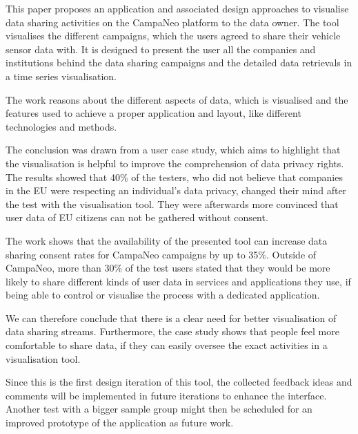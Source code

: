\documentclass[../paper.tex]{subfiles}
\begin{document}
  This paper proposes an application and associated design approaches
  to visualise data sharing activities on the CampaNeo platform to
  the data owner. The tool visualises the different campaigns, which
  the users agreed to share their vehicle sensor data with. It is
  designed to present the user all the companies and institutions
  behind the data sharing campaigns and the detailed data retrievals
  in a time series visualisation.

  The work reasons about the different aspects of data, which is
  visualised and the features used to achieve a proper application
  and layout, like different technologies and methods.

  The conclusion was drawn from a user case study, which aims to
  highlight that the visualisation is helpful to improve the
  comprehension of data privacy rights. The results showed that 40\%
  of the testers, who did not believe that companies in the EU were
  respecting an individual's data privacy, changed their mind after
  the test with the visualisation tool. They were afterwards more
  convinced that user data of EU citizens can not be gathered without
  consent.

  The work shows that the availability of the presented tool can increase
  data sharing consent rates for CampaNeo campaigns by up to 35\%.
  Outside of CampaNeo, more than 30\% of the test users stated that
  they would be more likely to share different kinds of user data in
  services and applications they use, if being able to control or
  visualise the process with a dedicated application.

  We can therefore conclude that there is a clear need for better
  visualisation of data sharing streams. Furthermore, the case study
  shows that people feel more comfortable to share data, if they
  can easily oversee the exact activities in a visualisation tool.

  Since this is the first design iteration of this tool, the collected
  feedback ideas and comments will be implemented in future iterations
  to enhance the interface. Another test with a bigger sample group
  might then be scheduled for an improved prototype of the application
  as future work.
\end{document}
